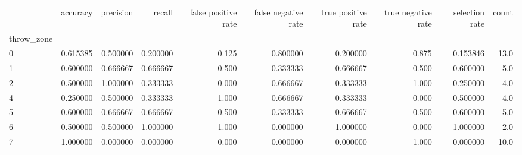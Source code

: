 \begin{tabular}{lrrrrrrrrr}
\toprule
{} &  accuracy &  precision &    recall &  false positive rate &  false negative rate &  true positive rate &  true negative rate &  selection rate &  count \\
throw\_zone &           &            &           &                      &                      &                     &                     &                 &        \\
\midrule
0          &  0.615385 &   0.500000 &  0.200000 &                0.125 &             0.800000 &            0.200000 &               0.875 &        0.153846 &   13.0 \\
1          &  0.600000 &   0.666667 &  0.666667 &                0.500 &             0.333333 &            0.666667 &               0.500 &        0.600000 &    5.0 \\
2          &  0.500000 &   1.000000 &  0.333333 &                0.000 &             0.666667 &            0.333333 &               1.000 &        0.250000 &    4.0 \\
4          &  0.250000 &   0.500000 &  0.333333 &                1.000 &             0.666667 &            0.333333 &               0.000 &        0.500000 &    4.0 \\
5          &  0.600000 &   0.666667 &  0.666667 &                0.500 &             0.333333 &            0.666667 &               0.500 &        0.600000 &    5.0 \\
6          &  0.500000 &   0.500000 &  1.000000 &                1.000 &             0.000000 &            1.000000 &               0.000 &        1.000000 &    2.0 \\
7          &  1.000000 &   0.000000 &  0.000000 &                0.000 &             0.000000 &            0.000000 &               1.000 &        0.000000 &   10.0 \\
\bottomrule
\end{tabular}
